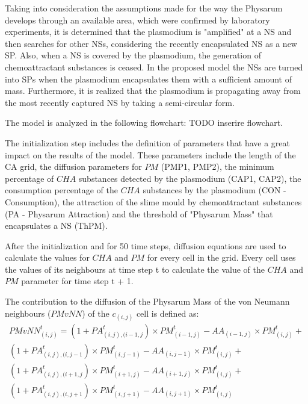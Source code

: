 Taking into consideration the assumptions made for the way the Physarum develops through an available area, which were confirmed by laboratory experiments, it is determined that the plasmodium is "amplified" at a NS and then searches for other NSs, considering the recently encapsulated NS as a new SP. Also, when a NS is covered by the plasmodium, the generation of chemoattractant substances is ceased.
In the proposed model the NSs are turned into SPs when the plasmodium encapsulates them with a sufficient amount of mass. Furthermore, it is realized that the plasmodium is propagating away from the most recently captured NS by taking a semi-circular form. 
\par
The model is analyzed in the following flowchart: TODO inserire flowchart.
\par
The initialization step includes the definition of parameters that have a great impact on the results of the model. These parameters include the length of the CA grid, the diffusion parameters for $PM$ (PMP1, PMP2), the minimum percentage of $CHA$ substances detected by the plasmodium (CAP1, CAP2), the consumption percentage of the $CHA$ substances by the plasmodium (CON - Consumption), the attraction of the slime mould by chemoattractant substances (PA - Physarum Attraction) and the threshold of "Physarum Mass" that encapsulates a NS (ThPM).
\par
After the initialization and for 50 time steps, diffusion equations are used to calculate the values for $CHA$ and $PM$ for every cell in the grid. Every cell uses the values of its neighbours at time step t to calculate the value of the $CHA$ and $PM$ parameter for time step t + 1. 
\par
The contribution to the diffusion of the Physarum Mass of the von Neumann neighbours ($PMvNN$) of the $c_{(i,j)}$ cell is defined as:
\begin{equation}
\begin{split}
PMvNN^t_{(i, j)} = 
(1 + PA^t_{(i, j),(i-1, j}) \times PM^t_{(i-1, j)} - AA_{(i-1, j)} \times PM^t_{(i, j)} +
\\(1 + PA^t_{(i, j),(i, j-1}) \times PM^t_{(i, j-1)} - AA_{(i, j-1)} \times PM^t_{(i, j)} +
\\(1 + PA^t_{(i, j),(i+1, j}) \times PM^t_{(i+1, j)} - AA_{(i+1, j)} \times PM^t_{(i, j)}  +
\\(1 + PA^t_{(i, j),(i, j+1}) \times PM^t_{(i, j+1)} - AA_{(i, j+1)} \times PM^t_{(i, j)}
\end{split}
\end{equation}
